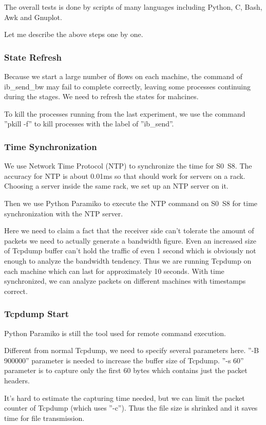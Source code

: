 \documentclass[12pt,a4paper]{article}
\begin{document}
The overall tests is done by scripts of many languages including Python, C, Bash, Awk and Gnuplot.

Let me describe the above steps one by one.

\subsubsection{State Refresh}

Because we start a large number of flows on each machine, the command of ib\_send\_bw may fail to complete correctly, leaving
some processes continuing during the stages. We need to refresh the states for mahcines.

To kill the processes running from the last experiment, we use the command ''pkill -f'' to kill processes with the label of ''ib\_send''.

\subsubsection{Time Synchronization}
We use Network Time Protocol (NTP) to synchronize the time for S0~S8.
The accuracy for NTP is about 0.01ms so that should work for servers on a rack.
Choosing a server inside the same rack, we set up an NTP server on it.

Then we use Python Paramiko to execute the NTP command on S0~S8 for time synchronization with the NTP server.

Here we need to claim a fact that the receiver side can't tolerate the amount of packets we need to actually generate a bandwidth figure.
Even an increased size of Tcpdump buffer can't hold the traffic of even 1 second which is obviously not enough to analyze the bandwidth tendency.
Thus we are running Tcpdump on each machine which can last for approximately 10 seconds.
With time synchronized, we can analyze packets on different machines with timestamps correct.

\subsubsection{Tcpdump Start}
Python Paramiko is still the tool used for remote command execution.

Different from normal Tcpdump, we need to specify several parameters here.
''-B 900000'' parameter is needed to increase the buffer size of Tcpdump.
''-s 60'' parameter is to capture only the first 60 bytes which contains just the packet headers.

It's hard to estimate the capturing time needed, but we can limit the packet counter of Tcpdump (which uses ''-c'').
Thus the file size is shrinked and it saves time for file transmission.
\end{document}
